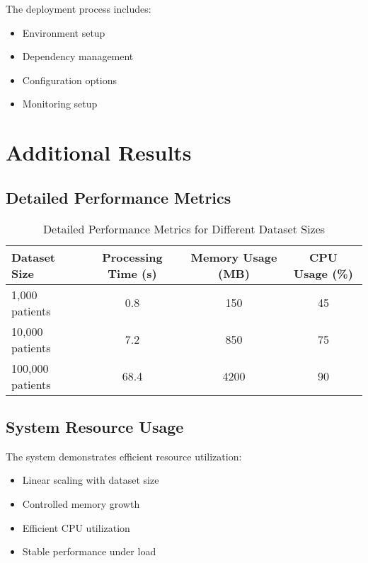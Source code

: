 \documentclass[12pt]{article}
\begin{document}
\begin{appendices}
The deployment process includes:
\begin{itemize}
    \item Environment setup
    \item Dependency management
    \item Configuration options
    \item Monitoring setup
\end{itemize}

\section{Additional Results}

\subsection{Detailed Performance Metrics}

\begin{table}[htbp]
\centering
\caption{Detailed Performance Metrics for Different Dataset Sizes}
\begin{tabular}{lccc}
\toprule
Dataset Size & Processing Time (s) & Memory Usage (MB) & CPU Usage (\%) \\
\midrule
1,000 patients & 0.8 & 150 & 45 \\
10,000 patients & 7.2 & 850 & 75 \\
100,000 patients & 68.4 & 4200 & 90 \\
\bottomrule
\end{tabular}
\label{tab:detailed_performance}
\end{table}

\subsection{System Resource Usage}

The system demonstrates efficient resource utilization:
\begin{itemize}
    \item Linear scaling with dataset size
    \item Controlled memory growth
    \item Efficient CPU utilization
    \item Stable performance under load
\end{itemize}

\end{appendices}
\end{document}
